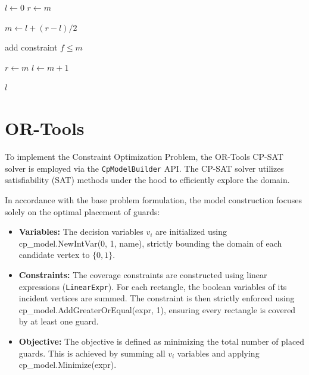 \documentclass{report}
\begin{document}
\vspace{1\baselineskip}

\begin{algorithmic}


    \State $l \leftarrow 0$
    \State $r \leftarrow m$


        \State $m \leftarrow l + (r-l)/2$

        \State add constraint $f \leq m$

            \State $r \leftarrow m$
        \Else
            \State $l \leftarrow m + 1$
        \EndIf

    \EndWhile

    \State \Return $l$

\EndProcedure

\end{algorithmic}

\section{OR-Tools}
To implement the Constraint Optimization Problem, the OR-Tools CP-SAT solver is employed via the \texttt{CpModelBuilder} API. The CP-SAT solver utilizes satisfiability (SAT) methods under the hood to efficiently explore the domain.

In accordance with the base problem formulation, the model construction focuses solely on the optimal placement of guards:
\begin{itemize}
    \item \textbf{Variables:} The decision variables $v_i$ are initialized using cp\_model.NewIn\allowbreak tVar(0, 1, name), strictly bounding the domain of each candidate vertex to $\{0, 1\}$.
    \item \textbf{Constraints:} The coverage constraints are constructed using linear expressions (\texttt{LinearExpr}). For each rectangle, the boolean variables of its incident vertices are summed. The constraint is then strictly enforced using cp\_model.AddGreaterOrEqual(expr, 1), ensuring every rectangle is covered by at least one guard.
    \item \textbf{Objective:} The objective is defined as minimizing the total number of placed guards. This is achieved by summing all $v_i$ variables and applying cp\_model.Minimize(expr).
\end{itemize}
\end{document}
